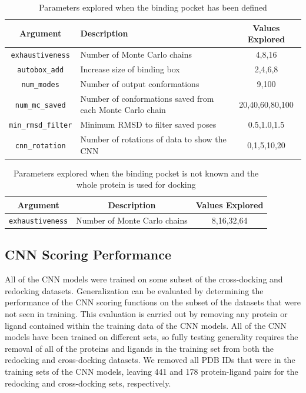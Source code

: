 \documentclass[linenumbers,doublespacing]{bmcart}
\begin{document}
\begin{table}[tb]
    \centering
    \begin{tabular}{|c|p{}|c|}
        \hline Argument & Description & Values Explored \\ \hline
         \texttt{exhaustiveness} & Number of Monte Carlo chains & 4,8,16 \\ \hline
         \texttt{autobox\_add} & Increase size of binding box & 2,4,6,8 \\ \hline
         \texttt{num\_modes} & Number of output conformations & 9,100 \\ \hline
         \texttt{num\_mc\_saved} & Number of conformations saved from each Monte Carlo chain & 20,40,60,80,100 \\ \hline
         \texttt{min\_rmsd\_filter} & Minimum RMSD to filter saved poses & 0.5,1.0,1.5 \\ \hline
         \texttt{cnn\_rotation} & Number of rotations of data to show the CNN & 0,1,5,10,20 \\ \hline
    \end{tabular}
    \caption{Parameters explored when the binding pocket has been defined}
    \label{tab:SettingsExplPocket}
\end{table}

\begin{table}[tb]
    \centering
    \begin{tabular}{|c|c|c|}
        \hline Argument & Description & Values Explored \\ \hline
         \texttt{exhaustiveness} & Number of Monte Carlo chains & 8,16,32,64 \\ \hline
    \end{tabular}
    \caption{Parameters explored when the binding pocket is not known and the whole protein is used for docking}
    \label{tab:SettingsExplWP}
\end{table}

\subsection{CNN Scoring Performance}
All of the CNN models were trained on some subset of the cross-docking and redocking datasets. Generalization can be evaluated by determining the performance of the CNN scoring functions on the subset of the datasets that were not seen in training. This evaluation is carried out by removing any protein or ligand contained within the training data of the CNN models. All of the CNN models have been trained on different sets, so fully testing generality requires the removal of all of the proteins and ligands in the training set from both the redocking and cross-docking datasets. We removed all PDB IDs that were in the training sets of the CNN models\cite{liu2017forging,francoeur2020three}, leaving 441 and 178 protein-ligand pairs for the redocking and cross-docking sets, respectively.
\end{document}
